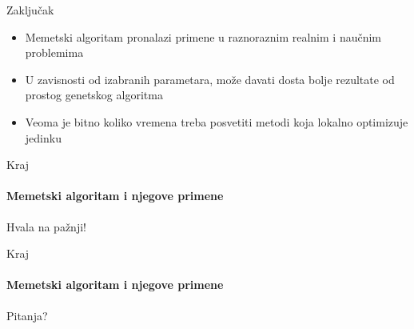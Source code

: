 \documentclass{beamer}
\begin{document}
\begin{frame}[fragile]{Zaključak}
  
   \begin{itemize}
    \item{Memetski algoritam pronalazi primene u raznoraznim realnim i naučnim problemima}
    \item{U zavisnosti od izabranih parametara, može davati dosta bolje rezultate od prostog genetskog algoritma}
    \item{Veoma je bitno koliko vremena treba posvetiti metodi koja lokalno optimizuje jedinku}
    
    \end{itemize}
\end{frame}


\begin{frame}{Kraj}
  \framesubtitle{Memetski algoritam i njegove primene}

  
\centering
\Huge{Hvala na pažnji!}

\end{frame}




\begin{frame}{Kraj}
  \framesubtitle{Memetski algoritam i njegove primene}
\centering
\Huge{Pitanja?}

\end{frame}

 

\end{document}
